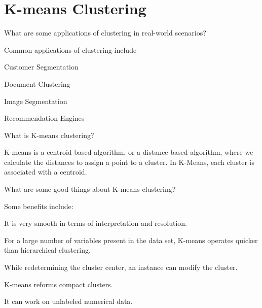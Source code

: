 	\chapter{K-means Clustering}

	\resetquestioncounter{}
	\begin{qanda}
		\begin{question}
What are some applications of clustering in real-world scenarios?
		\end{question}

		\begin{answer}
Common applications of clustering include

	\begin{bulletedlist}
		\item Customer Segmentation
		\item Document Clustering
		\item Image Segmentation
		\item Recommendation Engines
	\end{bulletedlist}
		\end{answer}
	\end{qanda}

	\begin{qanda}
		\begin{question}
What is K-means clustering?
		\end{question}

		\begin{answer}
K-means is a centroid-based algorithm, or a distance-based algorithm, where we calculate the distances to assign a point to a cluster. In K-Means, each cluster is associated with a centroid.
		\end{answer}
	\end{qanda}

	\begin{qanda}
		\begin{question}
What are some good things about K-means clustering?
		\end{question}

		\begin{answer}
Some benefits include:
	\begin{bulletedlist}
		\item It is very smooth in terms of interpretation and resolution.
		\item For a large number of variables present in the data set, K-means operates quicker than hierarchical clustering.
		\item While redetermining the cluster center, an instance can modify the cluster.
		\item K-means reforms compact clusters.
		\item It can work on unlabeled numerical data.
	\end{bulletedlist}
		\end{answer}
	\end{qanda}


